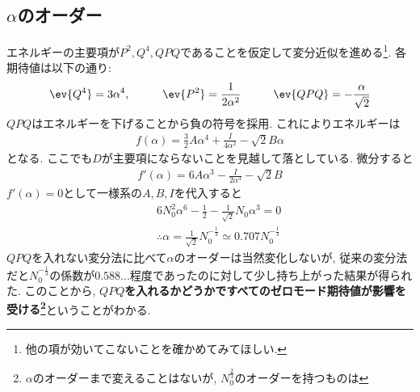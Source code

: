 \documentclass[10.5pt,a4paper]{jreport}
\begin{document}
\subsection{$\alpha$のオーダー}
エネルギーの主要項が$P^2, Q^4, QPQ$であることを仮定して変分近似を進める\footnote{他の項が効いてこないことを確かめてみてほしい. }. 各期待値は以下の通り:
\begin{eqnarray}
  \ev{Q^4} = 3\alpha^4, \hspace{1cm}\ev{P^2} = \frac{1}{2\alpha^2}\hspace{1cm}\ev{QPQ} = -\frac{\alpha}{\sqrt{2}}
\end{eqnarray}
$QPQ$はエネルギーを下げることから負の符号を採用. これによりエネルギーは
\begin{eqnarray}
  f(\alpha) = \frac32A\alpha^4 + \frac{I}{4\alpha^2} - \sqrt{2}B\alpha
\end{eqnarray}
となる. ここでも$D$が主要項にならないことを見越して落としている. 微分すると
\begin{eqnarray}
  f'(\alpha) = 6A\alpha^3 - \frac{I}{2\alpha^3} - \sqrt{2}B
\end{eqnarray}
$f'(\alpha)=0$として一様系の$A, B, I$を代入すると
\begin{eqnarray}
  &&6N_0^2\alpha^6 - \frac{1}{2} - \frac{1}{\sqrt{2}}N_0\alpha^3 = 0\\
  &&\therefore \alpha = \frac{1}{\sqrt{2}}N_0^{-\frac13}\simeq 0.707N_0^{-\frac13}
\end{eqnarray}
$QPQ$を入れない変分法に比べて$\alpha$のオーダーは当然変化しないが, 従来の変分法だと$N_0^{-\frac13}$の係数が$0.588...$程度であったのに対して少し持ち上がった結果が得られた. このことから, \textbf{$QPQ$を入れるかどうかですべてのゼロモード期待値が影響を受ける\footnote{$\alpha$のオーダーまで変えることはないが, $N_0^{\frac{2}{3}}$のオーダーを持つものは}}ということがわかる. 
\end{document}
